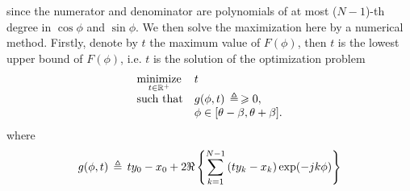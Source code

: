 since the numerator and denominator are polynomials of
at most ($N-1$)-th degree in $\cos{\phi}$ and $\sin{\phi}$.
We then solve the maximization here by a numerical method.
Firstly, denote by $t$ the maximum value of $F(\phi)$, then $t$ is the
lowest upper bound of $F(\phi)$, i.e. $t$ is the solution of
the optimization problem
 \begin{equation}\label{Fphi_minimization}
\begin{array}{ll}
 \underset{t \in \mathbb{R}^{+}}{\text{minimize}} & t \\
                           \text{such that} &
                           g(\phi, t)\thinspace \triangleq \thinspace \geqslant 0, \\
 & \phi \in [\theta - \beta,\theta + \beta].
  \end{array}
\end{equation}
where
 $$
  g(\phi, t)\thinspace \triangleq \thinspace ty_0 - x_0 +
                           2\Re \left\{ \sum_{k=1}^{N-1}\left(ty_k - x_k\right)\exp(-jk\phi)\right\}
 $$


